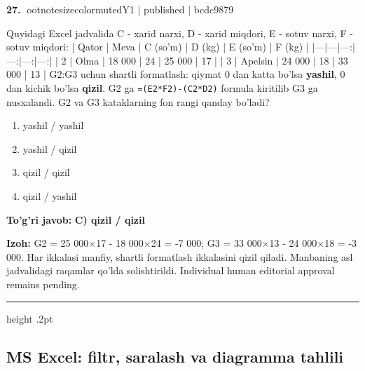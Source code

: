 \documentclass[10pt,a4paper]{article}
\begin{document}
\textbf{\color{ink}27.} {ootnotesizecolor{muted}Y1 | published | bcdc9879}
\par
Quyidagi Excel jadvalida C - xarid narxi, D - xarid miqdori, E - sotuv narxi, F - sotuv miqdori: \newline  \newline | Qator | Meva | C (so'm) | D (kg) | E (so'm) | F (kg) | \newline |---|---|---:|---:|---:|---:| \newline | 2 | Olma | 18 000 | 24 | 25 000 | 17 | \newline | 3 | Apelsin | 24 000 | 18 | 33 000 | 13 | \newline  \newline G2:G3 uchun shartli formatlash: qiymat 0 dan katta bo'lsa \textbf{yashil}, 0 dan kichik bo'lsa \textbf{qizil}. G2 ga \texttt{=(E2*F2)-(C2*D2)} formula kiritilib G3 ga nusxalandi. G2 va G3 kataklarning fon rangi qanday bo'ladi?
\begin{enumerate}[label=\Alph*),leftmargin=9mm]
\item yashil / yashil
\item yashil / qizil
\item qizil / qizil
\item qizil / yashil
\end{enumerate}
\begin{tcolorbox}[enhanced,breakable,colback=teal!4,colframe=teal!55!black,boxrule=0.45pt,arc=1.2mm,left=2.8mm,right=2.8mm,top=2mm,bottom=2mm]
\textbf{\color{teal}To'g'ri javob:} \textbf{C) qizil / qizil}
\par\smallskip
\textbf{Izoh:} G2 = 25 000\ensuremath{\times}17 - 18 000\ensuremath{\times}24 = -7 000; G3 = 33 000\ensuremath{\times}13 - 24 000\ensuremath{\times}18 = -3 000. Har ikkalasi manfiy, shartli formatlash ikkalasini qizil qiladi. Manbaning asl jadvalidagi raqamlar qo'lda solishtirildi. Individual human editorial approval remains pending.
\end{tcolorbox}
\vspace{2mm}\hrule height .2pt\vspace{2mm}
\subsection{MS Excel: filtr, saralash va diagramma tahlili}
\end{document}
